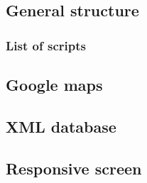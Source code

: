 \documentclass[pra,aps,onecolumn,letter,nopacs,nofootinbib,longbibliography,notitlepage]{revtex4-1}
\theoremstyle{plain}
\theoremstyle{definition}
\begin{document}
\subsection{General structure}

\subsubsection{List of scripts}

\subsection{Google maps}

\subsection{XML database}

\subsection{Responsive screen}
\end{document}
